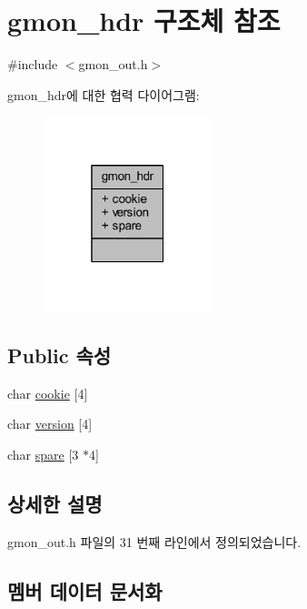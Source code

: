 \hypertarget{structgmon__hdr}{}\section{gmon\+\_\+hdr 구조체 참조}
\label{structgmon__hdr}


{\ttfamily \#include $<$gmon\+\_\+out.\+h$>$}



gmon\+\_\+hdr에 대한 협력 다이어그램\+:\nopagebreak
\begin{figure}[H]
\begin{center}
\leavevmode
\includegraphics[width=139pt]{structgmon__hdr__coll__graph}
\end{center}
\end{figure}
\subsection*{Public 속성}
\begin{DoxyCompactItemize}
\item 
char \mbox{\hyperlink{structgmon__hdr_a9e6e4c738f31c7bfe47a4507f9eb77fa}{cookie}} \mbox{[}4\mbox{]}
\item 
char \mbox{\hyperlink{structgmon__hdr_a7c55998776369522f545c4d74889d92e}{version}} \mbox{[}4\mbox{]}
\item 
char \mbox{\hyperlink{structgmon__hdr_a6d6fb9f3dc97f964c24f900cace54992}{spare}} \mbox{[}3 $\ast$4\mbox{]}
\end{DoxyCompactItemize}


\subsection{상세한 설명}


gmon\+\_\+out.\+h 파일의 31 번째 라인에서 정의되었습니다.



\subsection{멤버 데이터 문서화}
\mbox{\label{structgmon__hdr_a9e6e4c738f31c7bfe47a4507f9eb77fa}} 
